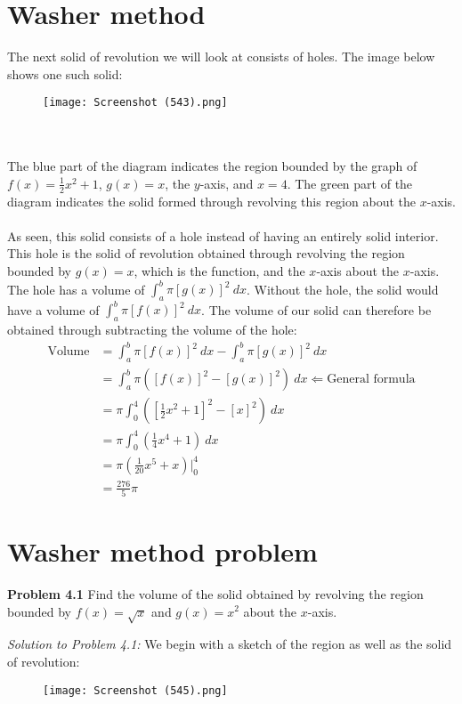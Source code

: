 \documentclass[11pt]{scrartcl}
\begin{document}
\section{Washer method}
\noindent 
The next solid of revolution we will look at consists of holes. The image below shows one such solid: 
\begin{figure}[htp]
    \centering
    \texttt{[image: Screenshot (543).png]}
\end{figure} \\
\\
\noindent 
The blue part of the diagram indicates the region bounded by the graph of $f(x)=\frac{1}{2}x^2+1$, $g(x)=x$, the $y$-axis, and $x=4$. The green part of the diagram indicates the solid formed through revolving this region about the $x$-axis. \\
\\
\noindent 
As seen, this solid consists of a hole instead of having an entirely solid interior. This hole is the solid of revolution obtained through revolving the region bounded by $g(x)=x$, which is the  function, and the $x$-axis about the $x$-axis. The hole has a volume of $\int_a^b{\pi[g(x)]^2 \ dx}$. Without the hole, the solid would have a volume of $\int_a^b{\pi[f(x)]^2 \ dx}$. The volume of our solid can therefore be obtained through subtracting the volume of the hole:
\begin{align*}
    \text{Volume} &=\int_a^b{\pi[f(x)]^2 \ dx}-\int_a^b{\pi[g(x)]^2 \ dx} \\
                  &=\int_a^b{\pi([f(x)]^2-[g(x)]^2) \ dx} \Leftarrow \text{General formula} \\
                  &=\pi \int_0^4{([\tfrac{1}{2}x^2+1]^2-[x]^2) \ dx} \\
                  &=\pi \int_0^4{(\tfrac{1}{4}x^4+1)} \ dx \\
                  &=\pi \left(\frac{1}{20}x^5+x\right) \biggr \rvert_0^4 \\
                  &=\frac{276}{5}\pi
\end{align*}
\section{Washer method problem}
\begin{tcolorbox}[colback=purple!5!white,colframe=purple!75!black]
\textbf{Problem 4.1} Find the volume of the solid obtained by revolving the region bounded by $f(x)=\sqrt{x}$ and $g(x)=x^2$ about the $x$-axis. 
\end{tcolorbox}
\noindent 
\textit{Solution to Problem 4.1:} We begin with a sketch of the region as well as the solid of revolution: 
\begin{figure}[htp]
    \centering
    \texttt{[image: Screenshot (545).png]}
\end{figure}
\\
\end{document}

